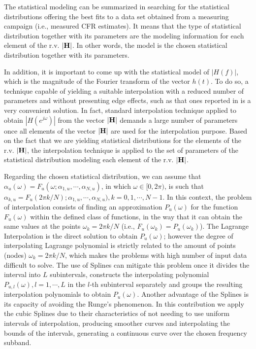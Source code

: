 \documentclass[journal]{IEEEtran}
\begin{document}
The statistical modeling can be summarized in searching for the statistical distributions offering the best fits to a data set obtained from a measuring campaign (i.e., measured \ac{CFR} estimates). It means that the type of statistical distribution together with its parameters are the modeling information for each element of the \ac{r.v.}  ${\bf |H|}$. In other words, the model is the chosen statistical distribution together with its parameters.

In addition, it is important to come up with the statistical model of $|H(f)|$, which is the magnitude of the Fourier transform of the vector $h(t)$. To do so, a technique capable of yielding a suitable interpolation with a reduced number of parameters and without presenting edge effects, such as that ones reported in \cite{Luis:AI} is a very convenient solution. In fact, standard interpolation technique applied to obtain $|H(e^{j\omega})|$ from the vector $\bf |H|$ demands a large number of parameters \cite{mitra} once all elements of the vector $\bf |H|$ are used for the interpolation purpose. Based on the fact that we are yielding statistical distributions for the elements of the \ac{r.v.} $\bf |H|$, the interpolation technique is applied to the set of parameters of the statistical distribution modeling each element of the \ac{r.v.} $\bf |H|$.

Regarding the chosen statistical distribution, we can assume that $\alpha_u (\omega) = F_u(\omega; \alpha_{1,u}, \cdots, \alpha_{N,u})$, in which $\omega \in [0,2\pi)$, is such that $\alpha_{k,u} = F_u(2\pi k/N); \alpha_{1,u}, \cdots, \alpha_{N,u}),k=0,1,\cdots,N-1$. In this context, the problem of interpolation consists of finding an approximation $P_u(\omega)$ for the function $F_u(\omega)$ within the defined class of functions, in the way that it can obtain the same values at the points $\omega_k = 2\pi k/N$ (i.e., $F_u(\omega_k)=P_u(\omega_k)$). The Lagrange Interpolation is the direct solution to obtain $P_u(\omega)$; however the degree of interpolating Lagrange polynomial is strictly related to the amount of points (nodes)  $\omega_k = 2\pi k/N$, which makes the problems with high number of input data difficult to solve. The use of Splines can mitigate this problem once it divides the interval into $L$ subintervals, constructs the interpolating polynomial $P_{u,l}(\omega),l=1,\cdots,L$ in the $l$-th subinterval separately and groups the resulting interpolation polynomials to obtain $P_u(\omega)$. Another advantage of the Splines is its capacity of avoiding the Runge's phenomenon. In this contribution we apply the cubic Splines \cite{Spline} due to their characteristics of not needing to use uniform intervals of interpolation, producing smoother curves and interpolating the bounds of the intervals, generating a continuous curve over the chosen frequency subband. 
\end{document}
